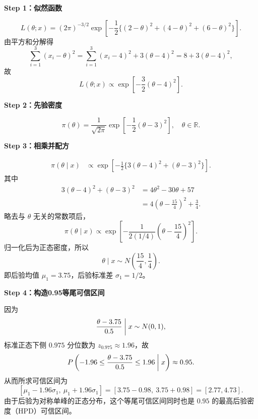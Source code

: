 \documentclass[UTF8,zihao=-4]{ctexart}
\newcommand{\step}[1]{\par\medskip\noindent\textbf{#1}\par\nopagebreak}
\begin{document}
\step{Step 1：似然函数}
\[
L(\theta;x)=(2\pi)^{-3/2}
\exp\left[-\frac12\{(2-\theta)^2+(4-\theta)^2+(6-\theta)^2\}\right].
\]
由平方和分解得
\[
\sum_{i=1}^3(x_i-\theta)^2
=\sum_{i=1}^3(x_i-4)^2+3(\theta-4)^2
=8+3(\theta-4)^2,
\]
故
\[
L(\theta;x)\propto\exp\left[-\frac32(\theta-4)^2\right].
\]

\step{Step 2：先验密度}
\[
\pi(\theta)=\frac1{\sqrt{2\pi}}
\exp\left[-\frac12(\theta-3)^2\right],\quad\theta\in\mathbb R.
\]

\step{Step 3：相乘并配方}
\begin{align*}
\pi(\theta\mid x)
&\propto\exp\left[-\frac12\{3(\theta-4)^2+(\theta-3)^2\}\right].
\end{align*}
其中
\begin{align*}
3(\theta-4)^2+(\theta-3)^2
&=4\theta^2-30\theta+57\\
&=4\left(\theta-\frac{15}{4}\right)^2+\frac34.
\end{align*}
略去与 $\theta$ 无关的常数项后，
\[
\pi(\theta\mid x)\propto
\exp\left[-\frac{1}{2(1/4)}\left(\theta-\frac{15}{4}\right)^2\right].
\]
归一化后为正态密度，所以
\[
\boxed{\theta\mid x\sim N\left(\frac{15}{4},\frac14\right).}
\]
即后验均值 $\mu_1=3.75$，后验标准差 $\sigma_1=1/2$。

\step{Step 4：构造0.95等尾可信区间}
因为
\[
\frac{\theta-3.75}{0.5}\biggm|x\sim N(0,1),
\]
标准正态下侧 $0.975$ 分位数为 $z_{0.975}\approx1.96$，故
\[
P\left(-1.96\leq\frac{\theta-3.75}{0.5}\leq1.96\biggm|x\right)\approx0.95.
\]
从而所求可信区间为
\[
\boxed{[\mu_1-1.96\sigma_1,\ \mu_1+1.96\sigma_1]
=[3.75-0.98,\ 3.75+0.98]=[2.77,4.73].}
\]
由于后验为对称单峰的正态分布，这个等尾可信区间同时也是 $0.95$ 的最高后验密度（HPD）可信区间。
\end{document}
